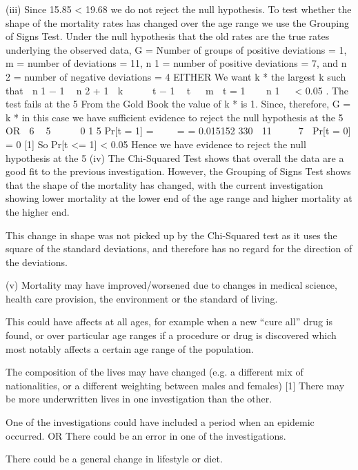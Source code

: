 \documentclass[a4paper,12pt]{article}
\begin{document}
(iii)
Since 15.85 < 19.68 
we do not reject the null hypothesis. 
To test whether the shape of the mortality rates has changed over the age range we use
the Grouping of Signs Test.
Under the null hypothesis that the old rates are the true rates underlying
the observed data, 
G = Number of groups of positive deviations = 1,
m = number of deviations = 11,
n 1 = number of positive deviations = 7, and
n 2 = number of negative deviations = 4 
EITHER
We want k * the largest k such that
 n 1 − 1  n 2 + 1 
k 


 t − 1  t 
 m 
t = 1
 
 n 1 

< 0.05 .
The test fails at the 5%
From the Gold Book the value of k * is 1. 
Since, therefore, G = k * in this case 
we have sufficient evidence to reject the null hypothesis at the 5%
OR
 6  5 
  
0 1
5
Pr[t = 1] =    =
= 0.015152
330
 11 
 
 7 
Pr[t = 0] = 0 [1]
So Pr[t <= 1] < 0.05 
Hence we have evidence to reject the null hypothesis at the 5%
(iv)
The Chi-Squared Test shows that overall the data are a good fit to the previous
investigation. 
However, the Grouping of Signs Test shows that the shape of the mortality has
changed, 
with the current investigation showing lower mortality at the lower end of the age
range and higher mortality at the higher end.

This change in shape was not picked up by the Chi-Squared test as it uses the square
of the standard deviations, and therefore has no regard for the direction of the
deviations.

(v)
Mortality may have improved/worsened due to changes in medical science, health
care provision, the environment or the standard of living.

This could have affects at all ages, for example when a new “cure all” drug is found,
or over particular age ranges if a procedure or drug is discovered which most notably
affects a certain age range of the population.

The composition of the lives may have changed (e.g. a different mix of nationalities,
or a different weighting between males and females)
[1]
There may be more underwritten lives in one investigation than the other.

One of the investigations could have included a period when an epidemic occurred.
OR There could be an error in one of the investigations.

There could be a general change in lifestyle or diet.
\end{document}
